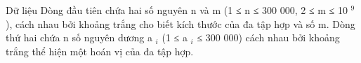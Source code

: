 Dữ liệu
Dòng đầu tiên chứa hai số nguyên n và m (1 ≤ n ≤ 300 000, 2 ≤ m ≤ 10   $^    9   $   ), cách nhau bởi khoảng trắng cho biết kích thước của đa tập hợp và số m. Dòng thứ hai chứa n số nguyên dương a   $_    i   $   (1 ≤ a   $_    i   $   ≤ 300 000) cách nhau bởi khoảng trắng thể hiện một hoán vị của đa tập hợp.